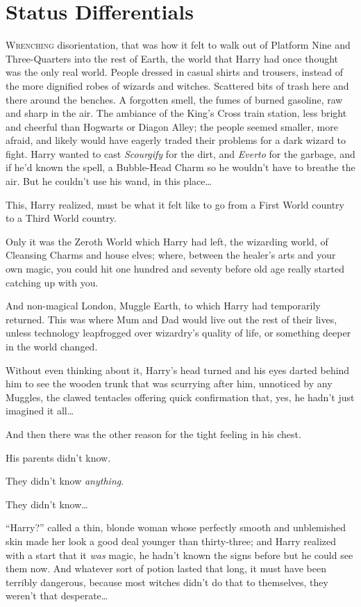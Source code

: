 \chapter{Status Differentials}

\lettrine{W}{renching} disorientation, that was how it felt to walk out of Platform Nine and Three-Quarters into the rest of Earth, the world that Harry had once thought was the only real world. People dressed in casual shirts and trousers, instead of the more dignified robes of wizards and witches. Scattered bits of trash here and there around the benches. A forgotten smell, the fumes of burned gasoline, raw and sharp in the air. The ambiance of the King’s Cross train station, less bright and cheerful than Hogwarts or Diagon Alley; the people seemed smaller, more afraid, and likely would have eagerly traded their problems for a dark wizard to fight. Harry wanted to cast \emph{Scourgify} for the dirt, and \emph{Everto} for the garbage, and if he’d known the spell, a Bubble-Head Charm so he wouldn’t have to breathe the air. But he couldn’t use his wand, in this place…

This, Harry realized, must be what it felt like to go from a First World country to a Third World country.

Only it was the Zeroth World which Harry had left, the wizarding world, of Cleansing Charms and house elves; where, between the healer’s arts and your own magic, you could hit one hundred and seventy before old age really started catching up with you.

And non-magical London, Muggle Earth, to which Harry had temporarily returned. This was where Mum and Dad would live out the rest of their lives, unless technology leapfrogged over wizardry’s quality of life, or something deeper in the world changed.

Without even thinking about it, Harry’s head turned and his eyes darted behind him to see the wooden trunk that was scurrying after him, unnoticed by any Muggles, the clawed tentacles offering quick confirmation that, yes, he hadn’t just imagined it all…

And then there was the other reason for the tight feeling in his chest.

His parents didn’t know.

They didn’t know \emph{anything}.

They didn’t know…

“Harry?” called a thin, blonde woman whose perfectly smooth and unblemished skin made her look a good deal younger than thirty-three; and Harry realized with a start that it \emph{was} magic, he hadn’t known the signs before but he could see them now. And whatever sort of potion lasted that long, it must have been terribly dangerous, because most witches didn’t do that to themselves, they weren’t that desperate…


